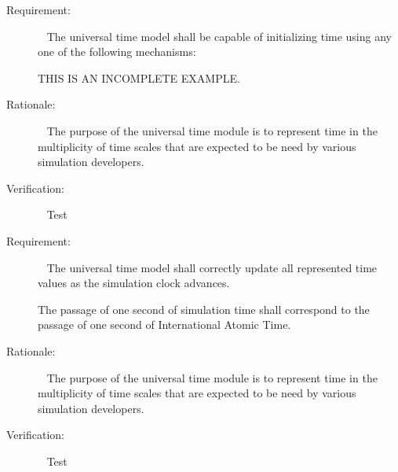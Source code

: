 \documentclass[twoside,11pt,titlepage]{report}
\begin{document}
\label{reqt:func_time_initialization}
\begin{description}
  \item[Requirement:]\ \newline
    The universal time model shall be capable of initializing
    time using any one of the following mechanisms:

      THIS IS AN INCOMPLETE EXAMPLE.

  \item[Rationale:]\ \newline
    The purpose of the universal time module is to represent
    time in the multiplicity of time scales that are expected to be
    need by various simulation developers.

  \item[Verification:]\ \newline
    Test
\end{description}

\label{reqt:func_time_update}
\begin{description}
  \item[Requirement:]\ \newline
    \subrequirement{}
    The universal time model shall correctly update all represented
    time values as the simulation clock advances.

    \subrequirement{}
    The passage of one second of simulation time shall correspond
    to the passage of one second of International Atomic Time.

  \item[Rationale:]\ \newline
    The purpose of the universal time module is to represent
    time in the multiplicity of time scales that are expected to be
    need by various simulation developers.

  \item[Verification:]\ \newline
    Test
\end{description}

\newpage
{}


\end{document}
